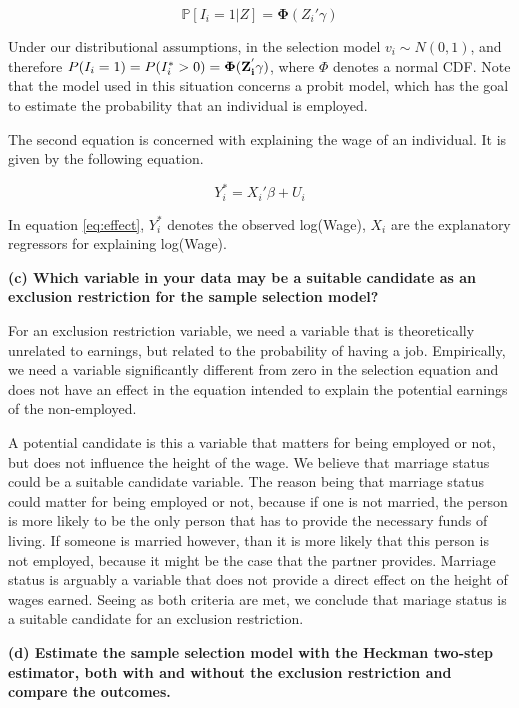 \documentclass[
]{article}
\begin{document}
\begin{equation}
\mathbb{P}[I_i=1|Z]=\mathbf{\Phi} (Z_i'\gamma)
\label{eq:select}
\end{equation}

Under our distributional assumptions, in the selection model
\(v_i \sim N(0,1)\), and therefore
\(P(I_i=1) = P(I_i^* > 0) = \bf{\Phi}(Z_i^{'} \gamma)\), where \(\Phi\)
denotes a normal CDF. Note that the model used in this situation
concerns a probit model, which has the goal to estimate the probability
that an individual is employed.

The second equation is concerned with explaining the wage of an
individual. It is given by the following equation.

\begin{equation}
Y_i^* = X_i'\beta + U_i
\label{eq:effect}
\end{equation}

In equation \ref{eq:effect}, \(Y_i^*\) denotes the observed log(Wage),
\(X_i\) are the explanatory regressors for explaining log(Wage).

\textbf{(c) Which variable in your data may be a suitable candidate as
an exclusion restriction for the sample selection model?}

For an exclusion restriction variable, we need a variable that is
theoretically unrelated to earnings, but related to the probability of
having a job. Empirically, we need a variable significantly different
from zero in the selection equation and does not have an effect in the
equation intended to explain the potential earnings of the non-employed.

A potential candidate is this a variable that matters for being employed
or not, but does not influence the height of the wage. We believe that
marriage status could be a suitable candidate variable. The reason being
that marriage status could matter for being employed or not, because if
one is not married, the person is more likely to be the only person that
has to provide the necessary funds of living. If someone is married
however, than it is more likely that this person is not employed,
because it might be the case that the partner provides. Marriage status
is arguably a variable that does not provide a direct effect on the
height of wages earned. Seeing as both criteria are met, we conclude
that mariage status is a suitable candidate for an exclusion
restriction.

\textbf{(d) Estimate the sample selection model with the Heckman
two-step estimator, both with and without the exclusion restriction and
compare the outcomes.}
\end{document}
